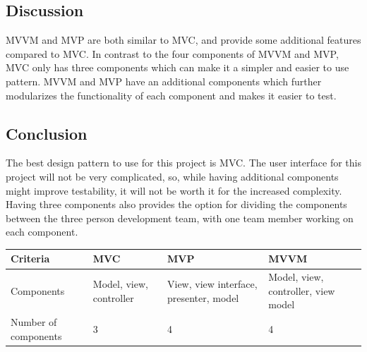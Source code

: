 \documentclass[onecolumn, draftclsnofoot,10pt, compsoc]{IEEEtran}
\begin{document}
\subsection{Discussion}
MVVM and MVP are both similar to MVC, and provide some additional features compared to MVC. In contrast to the four components of MVVM and MVP, MVC only has three components which can make it a simpler and easier to use pattern. MVVM and MVP have an additional components which further modularizes the functionality of each component and makes it easier to test.

\subsection{Conclusion}
The best design pattern to use for this project is MVC. The user interface for this project will not be very complicated, so, while having additional components might improve testability, it will not be worth it for the increased complexity. Having three components also provides the option for dividing the components between the three person development team, with one team member working on each component.

\begin{table}[h!]
\centering
\begin{tabular}{ |p{.2\linewidth}|p{.2\linewidth}|p{.2\linewidth}|p{.2\linewidth}| } 
\hline
\textbf{Criteria} & \textbf{MVC} & \textbf{MVP} & \textbf{MVVM} \\ \hline
Components & Model, view, controller & View, view interface, presenter, model & Model, view, controller, view model \\ \hline
Number of components & 3 & 4 & 4 \\ \hline
\end{tabular}
\end{table}

\newpage


\end{document}
